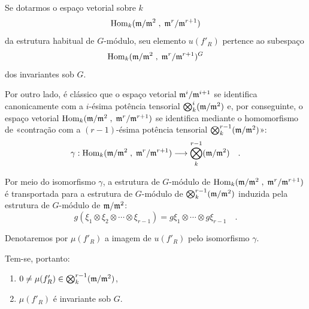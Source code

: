 Se dotarmos o espaço vetorial sobre $k$
\[
\operatorname{Hom}_k(\mathfrak m/\mathfrak m^2 \; , \; \mathfrak m^r/\mathfrak m^{r+1})
\]
da estrutura habitual de $G$-módulo, seu elemento $u(f'_R)$ pertence ao subespaço
\[
\operatorname{Hom}_k(\mathfrak m/\mathfrak m^2 \; , \; \mathfrak m^r/\mathfrak m^{r+1})^G
\]
dos invariantes sob $G$.

Por outro lado, é clássico que o espaço vetorial $\mathfrak m^i/\mathfrak m^{i+1}$ se identifica canonicamente com a $i$-ésima potência tensorial $\bigotimes_k^i (\mathfrak m/\mathfrak m^2)$ e, por conseguinte, o espaço vetorial $\operatorname{Hom}_k(\mathfrak m/\mathfrak m^2 \; , \; \mathfrak m^r/\mathfrak m^{r+1})$ se identifica mediante o homomorfismo de «contração com a $(r-1)$-ésima potência tensorial $\bigotimes_k^{r-1}(\mathfrak m/\mathfrak m^2)$»:
\[
\gamma : \operatorname{Hom}_k(\mathfrak m/\mathfrak m^2 \; , \; \mathfrak m^r/\mathfrak m^{r+1}) \longrightarrow \bigotimes_k^{r-1}(\mathfrak m/\mathfrak m^2) \quad .
\]

Por meio do isomorfismo $\gamma$, a estrutura de $G$-módulo de $\operatorname{Hom}_k(\mathfrak m/\mathfrak m^2 \; , \; \mathfrak m^r/\mathfrak m^{r+1})$ é transportada para a estrutura de $G$-módulo de $\bigotimes_k^{r-1}(\mathfrak m/\mathfrak m^2)$ induzida pela estrutura de $G$-módulo de $\mathfrak m/\mathfrak m^2$:
\[
g(\xi_1 \otimes \xi_2 \otimes \cdots \otimes \xi_{r-1}) = g\xi_1 \otimes \cdots \otimes g\xi_{r-1} \quad .
\]

Denotaremos por $\mu(f'_R)$ a imagem de $u(f'_R)$ pelo isomorfismo $\gamma$.

Tem-se, portanto:
\begin{enumerate}
\item[I)] $0 \neq \mu(f'_R) \in \bigotimes_k^{r-1}(\mathfrak m/\mathfrak m^2)$,
\item[II)] $\mu(f'_R)$ é invariante sob $G$.
\end{enumerate}
